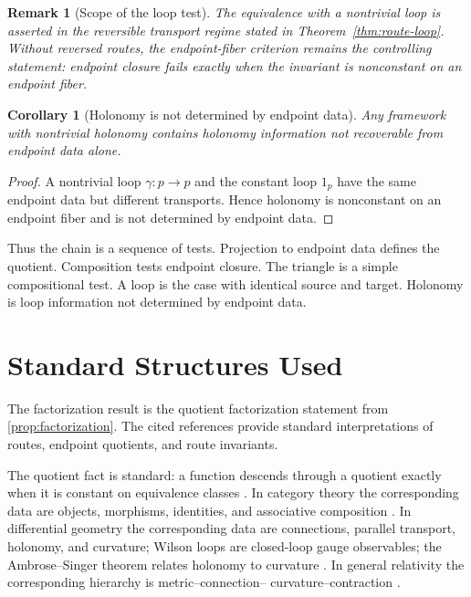 \documentclass[12pt]{article}
\newtheorem{corollary}[corollary]{Corollary}
\newtheorem{remark}[remark]{Remark}
\newcommand{\citep}[1]{\cite{#1}}
\begin{document}
\begin{remark}[Scope of the loop test]
The equivalence with a nontrivial loop is asserted in the reversible
transport regime stated in Theorem~\ref{thm:route-loop}. Without
reversed routes, the endpoint-fiber criterion remains the controlling
statement: endpoint closure fails exactly when the invariant is
nonconstant on an endpoint fiber.
\end{remark}

\begin{corollary}[Holonomy is not determined by endpoint data]
\label{cor:holonomy-endpoint}
Any framework with nontrivial holonomy contains holonomy information not
recoverable from endpoint data alone.
\end{corollary}

\begin{proof}
A nontrivial loop $\gamma:p\to p$ and the constant loop $1_p$ have the
same endpoint data but different transports. Hence holonomy is
nonconstant on an endpoint fiber and is not determined by endpoint data.
\end{proof}

Thus the chain is a sequence of tests. Projection to endpoint
data defines the quotient. Composition tests endpoint closure. The triangle
is a simple compositional test. A loop is the case with identical source
and target.
Holonomy is loop information not determined by endpoint data.

\section{Standard Structures Used}
\label{sec:existing-frameworks}

The factorization result is the quotient factorization statement from
\cref{prop:factorization}. The cited references provide standard
interpretations of routes, endpoint quotients, and route invariants.

The quotient fact is standard: a function descends through a quotient
exactly when it is constant on equivalence classes \citep{Munkres2000}.
In category theory the corresponding data are objects, morphisms,
identities, and associative composition
\citep{EilenbergMacLane1945,MacLane1998}. In differential geometry the
corresponding data are connections, parallel transport, holonomy, and
curvature; Wilson loops are closed-loop gauge observables; the
Ambrose--Singer theorem relates holonomy to curvature
\citep{Ehresmann1950,Wilson1974,AmbroseSinger1953,KobayashiNomizu1963,Nakahara2003}.
In general relativity the corresponding hierarchy is metric--connection--
curvature--contraction \citep{Einstein1916,Wald1984,Malament2012,Carroll2019}.
\end{document}
